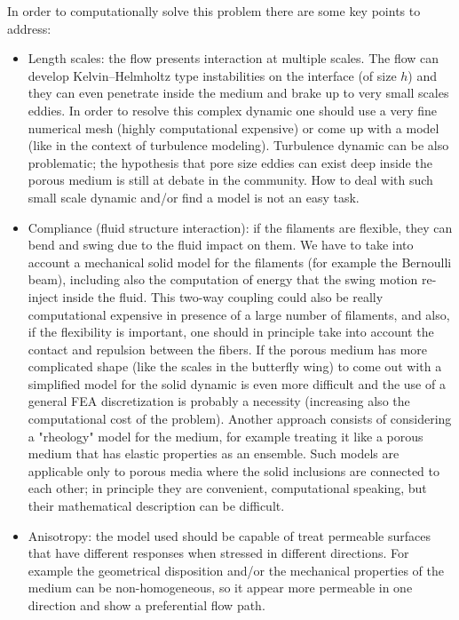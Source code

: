 In order to computationally solve this problem there are some key points to address:
\begin{itemize}
	\item Length scales: the flow presents interaction at multiple scales. The flow can develop Kelvin–Helmholtz type instabilities on the interface (of size $h$) and they can even penetrate inside the medium and brake up to very small scales eddies. In order to resolve this complex dynamic one should use a very fine numerical mesh (highly computational expensive) or come up with a model (like in the context of turbulence modeling).
	Turbulence dynamic can be also problematic; the hypothesis that pore size eddies can exist deep inside the porous medium is still at debate in the community.
	How to deal with such small scale dynamic and/or find a model is not an easy task.
	
	\item Compliance (fluid structure interaction): if the filaments are flexible, they can bend and swing due to the fluid impact on them.
	We have to take into account a mechanical solid model for the filaments (for example the Bernoulli beam), including also the computation of energy that the swing motion re-inject inside the fluid.
	This two-way coupling could also be really computational expensive in presence of a large number of filaments, and also, if the flexibility is important, one should in principle take into account the contact and repulsion between the fibers.
	If the porous medium has more complicated shape (like the scales in the butterfly wing) to come out with a simplified model for the solid dynamic is even more difficult and the use of a general FEA discretization is probably a necessity (increasing also the computational cost of the problem).
	Another approach consists of considering a "rheology" model for the medium, for example treating it like a porous medium that has elastic properties as an ensemble.
	Such models are applicable only to porous media where the solid inclusions are connected to each other; in principle they are convenient, computational speaking, but their mathematical description can be difficult.
	
	\item Anisotropy: the model used should be capable of treat permeable surfaces that have different responses when stressed in different directions. For example the geometrical disposition and/or the mechanical properties of the medium can be non-homogeneous, so it appear more permeable in one direction and show a preferential flow path.
\end{itemize}

